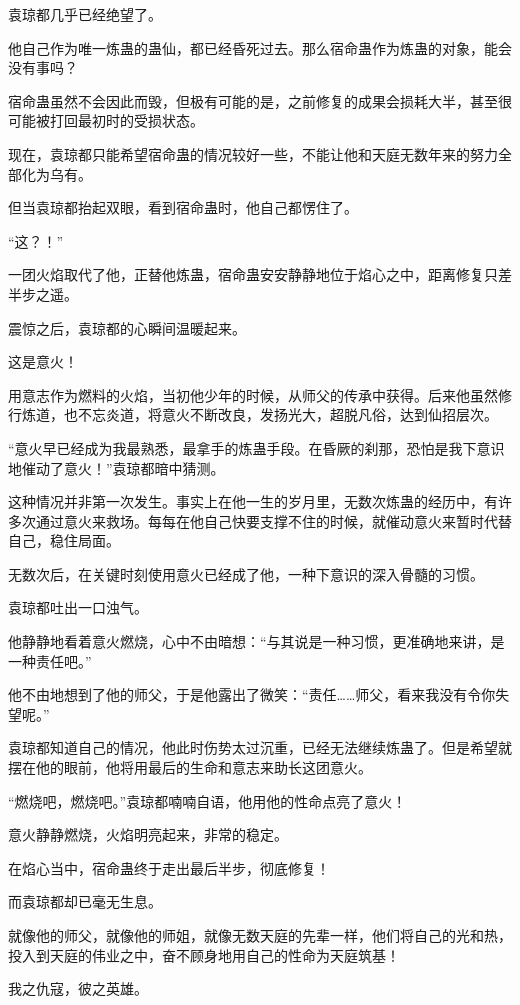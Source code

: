 \begin{this_body}
袁琼都几乎已经绝望了。

他自己作为唯一炼蛊的蛊仙，都已经昏死过去。那么宿命蛊作为炼蛊的对象，能会没有事吗？

宿命蛊虽然不会因此而毁，但极有可能的是，之前修复的成果会损耗大半，甚至很可能被打回最初时的受损状态。

现在，袁琼都只能希望宿命蛊的情况较好一些，不能让他和天庭无数年来的努力全部化为乌有。

但当袁琼都抬起双眼，看到宿命蛊时，他自己都愣住了。

“这？！”

一团火焰取代了他，正替他炼蛊，宿命蛊安安静静地位于焰心之中，距离修复只差半步之遥。

震惊之后，袁琼都的心瞬间温暖起来。

这是意火！

用意志作为燃料的火焰，当初他少年的时候，从师父的传承中获得。后来他虽然修行炼道，也不忘炎道，将意火不断改良，发扬光大，超脱凡俗，达到仙招层次。

“意火早已经成为我最熟悉，最拿手的炼蛊手段。在昏厥的刹那，恐怕是我下意识地催动了意火！”袁琼都暗中猜测。

这种情况并非第一次发生。事实上在他一生的岁月里，无数次炼蛊的经历中，有许多次通过意火来救场。每每在他自己快要支撑不住的时候，就催动意火来暂时代替自己，稳住局面。

无数次后，在关键时刻使用意火已经成了他，一种下意识的深入骨髓的习惯。

袁琼都吐出一口浊气。

他静静地看着意火燃烧，心中不由暗想：“与其说是一种习惯，更准确地来讲，是一种责任吧。”

他不由地想到了他的师父，于是他露出了微笑：“责任……师父，看来我没有令你失望呢。”

袁琼都知道自己的情况，他此时伤势太过沉重，已经无法继续炼蛊了。但是希望就摆在他的眼前，他将用最后的生命和意志来助长这团意火。

“燃烧吧，燃烧吧。”袁琼都喃喃自语，他用他的性命点亮了意火！

意火静静燃烧，火焰明亮起来，非常的稳定。

在焰心当中，宿命蛊终于走出最后半步，彻底修复！

而袁琼都却已毫无生息。

就像他的师父，就像他的师姐，就像无数天庭的先辈一样，他们将自己的光和热，投入到天庭的伟业之中，奋不顾身地用自己的性命为天庭筑基！

我之仇寇，彼之英雄。


\end{this_body}
